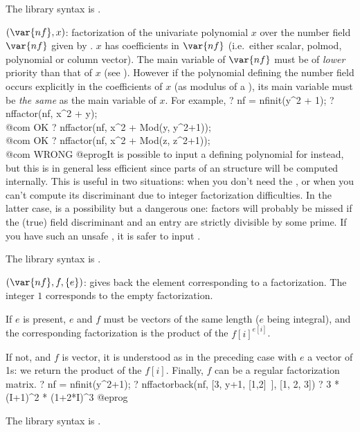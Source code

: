 The library syntax is .

$(\var{nf},x)$: \label{se:nffactor}factorization of the univariate
polynomial $x$ over the number field $\var{nf}$ given by . $x$
has coefficients in $\var{nf}$ (i.e.~either scalar, polmod, polynomial or
column vector). The main variable of $\var{nf}$ must be of \emph{lower}
priority than that of $x$ (see ). However if
the polynomial defining the number field occurs explicitly  in the
coefficients of $x$ (as modulus of a ), its main variable must be
\emph{the same} as the main variable of $x$. For example,
\bprog
? nf = nfinit(y^2 + 1);
? nffactor(nf, x^2 + y); \\@com OK
? nffactor(nf, x^2 + Mod(y, y^2+1)); \\ @com OK
? nffactor(nf, x^2 + Mod(z, z^2+1)); \\ @com WRONG
@eprog\noindent It is possible to input a defining polynomial for 
instead, but this is in general less efficient since parts of an 
structure will be computed internally. This is useful in two situations: when
you don't need the , or when you can't compute its discriminant due
to integer factorization difficulties. In the latter case,  is
a possibility but a dangerous one: factors will probably be missed if the
(true) field discriminant and an  entry are strictly divisible
by some prime. If you have such an unsafe , it is safer to input
.

The library syntax is .

$(\var{nf},f,\{e\})$: \label{se:nffactorback}gives back the  element corresponding to a factorization.
The integer $1$ corresponds to the empty factorization.

If $e$ is present, $e$ and $f$ must be vectors of the same length ($e$ being
integral), and the corresponding factorization is the product of the
$f[i]^{e[i]}$.

If not, and $f$ is vector, it is understood as in the preceding case with $e$
a vector of 1s: we return the product of the $f[i]$. Finally, $f$ can be a
regular factorization matrix.
\bprog
? nf = nfinit(y^2+1);
? nffactorback(nf, [3, y+1, [1,2]~], [1, 2, 3])
? 3 * (I+1)^2 * (1+2*I)^3
@eprog

The library syntax is .

